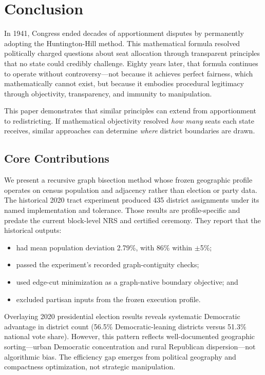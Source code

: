 \section{Conclusion}
\label{sec:conclusion}

In 1941, Congress ended decades of apportionment disputes by permanently adopting the Huntington-Hill method. This mathematical formula resolved politically charged questions about seat allocation through transparent principles that no state could credibly challenge. Eighty years later, that formula continues to operate without controversy—not because it achieves perfect fairness, which mathematically cannot exist, but because it embodies procedural legitimacy through objectivity, transparency, and immunity to manipulation.

This paper demonstrates that similar principles can extend from apportionment to redistricting. If mathematical objectivity resolved \textit{how many} seats each state receives, similar approaches can determine \textit{where} district boundaries are drawn.

\subsection{Core Contributions}

We present a recursive graph bisection method whose frozen geographic profile
operates on census population and adjacency rather than election or party data.
The historical 2020 tract experiment produced 435 district assignments under
its named implementation and tolerance. Those results are profile-specific and
predate the current block-level NRS and certified ceremony. They report that the
historical outputs:

\begin{itemize}
    \item had mean population deviation 2.79\%, with 86\% within $\pm$5\%;
    \item passed the experiment's recorded graph-contiguity checks;
    \item used edge-cut minimization as a graph-native boundary objective; and
    \item excluded partisan inputs from the frozen execution profile.
\end{itemize}

Overlaying 2020 presidential election results reveals systematic Democratic advantage in district count (56.5\% Democratic-leaning districts versus 51.3\% national vote share). However, this pattern reflects well-documented geographic sorting—urban Democratic concentration and rural Republican dispersion—not algorithmic bias. The efficiency gap emerges from political geography and compactness optimization, not strategic manipulation.

